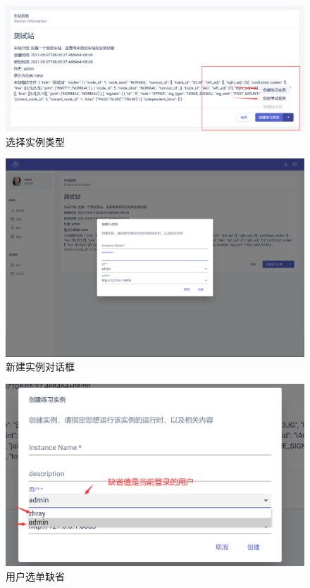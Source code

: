 \begin{figure}[htbp!]
    \centering
    \includegraphics[width=\textwidth]{figures/png/create_btn.png}
    \caption{\label{create_btn}选择实例类型}
\end{figure}

\begin{figure}[htbp!]
    \centering
    \includegraphics[width=\textwidth]{figures/png/dialog.png}
    \caption{\label{dialog}新建实例对话框}
\end{figure}

\begin{figure}[htbp!]
    \centering
    \includegraphics[width=\textwidth]{figures/png/dialog_detail.png}
    \caption{\label{dialog_detail}用户选单缺省}
\end{figure}

